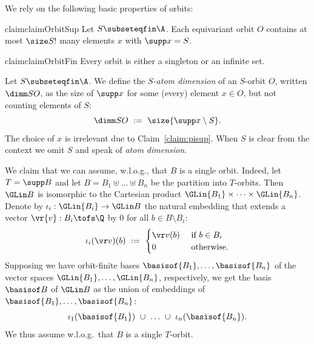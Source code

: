 We rely on the following basic properties of orbits:

\begin{restatable}{claim}{claimOrbitSup}
\label{claim:orbitsup}
Let $S\subseteqfin\A$.
Each equivariant orbit $O$ 
contains at most $\size S!$ many elements $x$ with $\supp x = S$.
\end{restatable}
%

\vspace{-2mm}
\begin{restatable}{claim}{claimOrbitFin}
\label{claim:orbitfin}
Every orbit is either a singleton or an infinite set.
\end{restatable}
%

\begin{definition}
Let $S\subseteqfin\A$.
We define the \emph{$S$-atom dimension} of an $S$-orbit $O$, written
$\dimm S O$, as the size of $\supp x$ for some (every) element $x\in O$, but not counting elements of $S$:
\[
\dimm S O \ := \ \size{\supp x \setminus S}.
\]
The choice of $x$ is irrelevant due to Claim~\ref{claim:pisup}.
When $S$ is clear from the context we omit $S$ and speak of \emph{atom dimension}.
\end{definition}



We claim that we can assume, w.l.o.g., that $B$ is a single orbit.
Indeed, let $T = \supp B$ and let $B = B_1 \uplus \dots \uplus B_n$ be the partition into $T$-orbits.
Then $\GLin B$ is isomorphic to the Cartesian product $\GLin{B_1} \times \dots \times \GLin{B_n}$.
Denote by $\iota_i : \GLin {B_i} \to \GLin B$ the natural embedding that extends a vector $\vr{v} : B_i \tofs \Q$ 
by 0 for all $b\in B\setminus B_i$:
\[
\iota_i(\vr v)(b) \ := \ 
\begin{cases}
\vr v(b) & \text{ if } b\in B_i \\
0 & \text{ otherwise.}
\end{cases}
\]  
Supposing we have orbit-finite bases $\basisof {B_1}, \ldots, \basisof{B_n}$ of the vector spaces $\GLin{B_1}, \ldots, \GLin{B_n}$, respectively,
we get the basis $\basisof B$ of $\GLin B$ as the union of embeddings of $\basisof {B_1}, \ldots, \basisof{B_n}$:
\[
\iota_1(\basisof{B_1}) \ \cup \ \ldots \ \cup \ \iota_n(\basisof{B_n}).
\]
We thus assume w.l.o.g.~that  $B$ is a single $T$-orbit. %

